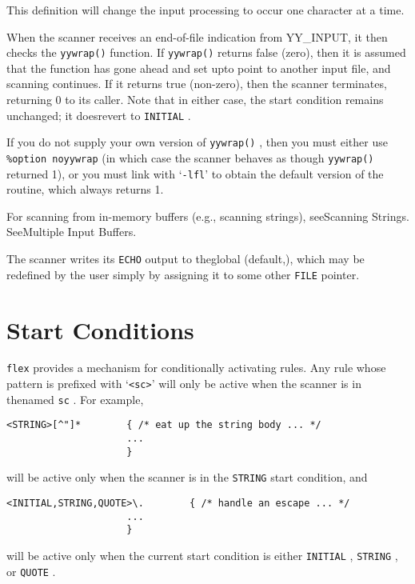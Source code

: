 \documentclass[openany,oneside]{book}
\begin{document}
This definition will change the input processing to occur one character
at a time.

When the scanner receives an end-of-file indication from YY\_{}INPUT, it
then checks the \verb`yywrap()` function.  If \verb`yywrap()` returns
false (zero), then it is assumed that the function has gone ahead and
set upto point to another input file, and scanning
continues.  If it returns true (non-zero), then the scanner terminates,
returning 0 to its caller.  Note that in either case, the start
condition remains unchanged; it doesrevert to \verb`INITIAL` .

If you do not supply your own version of \verb`yywrap()` , then you must
either use \verb`%option noyywrap` (in which case the scanner behaves as
though \verb`yywrap()` returned 1), or you must link with ‘\verb`-lfl`’ to
obtain the default version of the routine, which always returns 1.

For scanning from in-memory buffers (e.g., scanning strings), seeScanning Strings. SeeMultiple Input Buffers.

The scanner writes its \verb`ECHO` output to theglobal
(default,), which may be redefined by the user simply by
assigning it to some other \verb`FILE` pointer.
\chapter{Start Conditions}


 \verb`flex` provides a mechanism for conditionally activating rules. 
Any rule whose pattern is prefixed with ‘\verb`<sc>`’ will only be active
when the scanner is in thenamed \verb`sc` .  For
example,
\begin{verbatim}
<STRING>[^"]*        { /* eat up the string body ... */
                     ...
                     }
\end{verbatim}


will be active only when the scanner is in the \verb`STRING` start
condition, and


\begin{verbatim}
<INITIAL,STRING,QUOTE>\.        { /* handle an escape ... */
                     ...
                     }
\end{verbatim}


will be active only when the current start condition is either \verb`INITIAL` , \verb`STRING` , or \verb`QUOTE` .
\end{document}
